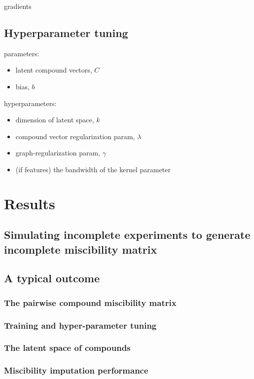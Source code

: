 \documentclass[11pt, oneside]{article}
\begin{document}
gradients

\subsection{Hyperparameter tuning}
parameters: 
\begin{itemize}	
	\item latent compound vectors, $C$
	\item bias, $b$
\end{itemize}
hyperparameters:
\begin{itemize}	
	\item dimension of latent space, $k$ 
	\item compound vector regularization param, $\lambda$
	\item graph-regularization param, $\gamma$
	\item (if features) the bandwidth of the kernel parameter
\end{itemize}


\section{Results}

\subsection{Simulating incomplete experiments to generate incomplete miscibility matrix}

\subsection{A typical outcome}
\subsubsection{The pairwise compound miscibility matrix}

\subsubsection{Training and hyper-parameter tuning}

\subsubsection{The latent space of compounds}
\subsubsection{Miscibility imputation performance}
\end{document}
